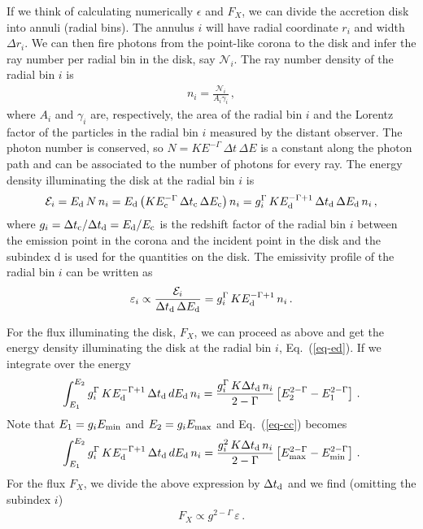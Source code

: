 \documentclass[twocolumn]{emulateapj}
\newcommand{\be}{\begin{eqnarray}}
\newcommand{\ee}{\end{eqnarray}}
\begin{document}
If we think of calculating numerically $\epsilon$ and $F_X$, we can divide the accretion disk into annuli (radial bins). The annulus $i$ will have radial coordinate $r_i$ and width $\Delta r_i$. We can then fire photons from the point-like corona to the disk and infer the ray number per radial bin in the disk, say $\mathcal{N}_i$. The ray number density of the radial bin $i$ is
\be
n_i = \frac{\mathcal{N}_i}{A_i \gamma_i} \, ,
\ee
where $A_i$ and $\gamma_i$ are, respectively, the area of the radial bin $i$ and the Lorentz factor of the particles in the radial bin $i$ measured by the distant observer. The photon number is conserved, so $N = K E^{-\Gamma} \, \Delta t \, \Delta E$ is a constant along the photon path and can be associated to the number of photons for every ray. The energy density illuminating the disk at the radial bin $i$ is
\be\label{eq-ed}
\mathcal{E}_i = E_{\rm d} \, N \, n_i 
= E_{\rm d} \left( K E^{-\Gamma}_{\rm c} \, \Delta t_{\rm c} \, \Delta E_{\rm c} \right) n_i
= g^\Gamma_i \, K E^{-\Gamma+1}_{\rm d} \, \Delta t_{\rm d} \, \Delta E_{\rm d} \, n_i \, ,
\ee
where $g_i = \Delta t_{\rm c}/\Delta t_{\rm d} = E_{\rm d}/E_{\rm c}$ is the redshift factor of the radial bin $i$ between the emission point in the corona and the incident point in the disk and the subindex d is used for the quantities on the disk. The emissivity profile of the radial bin $i$ can be written as
\be
\varepsilon_i \propto \frac{\mathcal{E}_i}{\Delta t_{\rm d} \, \Delta E_{\rm d}}
= g^\Gamma_i \, K E^{-\Gamma+1}_{\rm d} \, n_i \, .
\ee


For the flux illuminating the disk, $F_X$, we can proceed as above and get the energy density illuminating the disk at the radial bin $i$, Eq.~(\ref{eq-ed}). If we integrate over the energy
 \be\label{eq-cc}
 \int_{E_1}^{E_2} g^\Gamma_i \, K E^{-\Gamma+1}_{\rm d} \, \Delta t_{\rm d} \, d E_{\rm d} \, n_i
 = \frac{g^\Gamma_i \, K \Delta t_{\rm d} \, n_i}{2 - \Gamma} \left[ E_2^{2 - \Gamma} - E_1^{2 - \Gamma} \right] \, .
 \ee
Note that $E_1 = g_i E_{\rm min}$ and $E_2 = g_i E_{\rm max}$ and Eq.~(\ref{eq-cc}) becomes
 \be\label{eq-fx}
 \int_{E_1}^{E_2} g^\Gamma_i \, K E^{-\Gamma+1}_{\rm d} \, \Delta t_{\rm d} \, d E_{\rm d} \, n_i
 = \frac{g^2_i \, K \Delta t_{\rm d} \, n_i}{2 - \Gamma} \left[ E_{\rm max}^{2 - \Gamma} - E_{\rm min}^{2 - \Gamma} \right] \, .
 \ee 
  For the flux $F_X$, we divide the above expression by $ \Delta t_{\rm d}$ and we find (omitting the subindex $i$)
 \be
F_X \propto g^{2 - \Gamma} \, \varepsilon \, .
\ee
\end{document}
